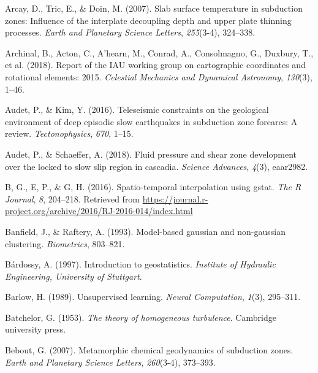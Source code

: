 \begin{CSLReferences}{1}{1}
\leavevmode{}%
Arcay, D., Tric, E., \& Doin, M. (2007). Slab surface temperature in subduction zones: Influence of the interplate decoupling depth and upper plate thinning processes. \emph{Earth and Planetary Science Letters}, \emph{255}(3-4), 324--338.

\leavevmode{}%
Archinal, B., Acton, C., A'hearn, M., Conrad, A., Consolmagno, G., Duxbury, T., et al. (2018). Report of the IAU working group on cartographic coordinates and rotational elements: 2015. \emph{Celestial Mechanics and Dynamical Astronomy}, \emph{130}(3), 1--46.

\leavevmode{}%
Audet, P., \& Kim, Y. (2016). Teleseismic constraints on the geological environment of deep episodic slow earthquakes in subduction zone forearcs: A review. \emph{Tectonophysics}, \emph{670}, 1--15.

\leavevmode{}%
Audet, P., \& Schaeffer, A. (2018). Fluid pressure and shear zone development over the locked to slow slip region in cascadia. \emph{Science Advances}, \emph{4}(3), eaar2982.

\leavevmode{}%
B, G., E, P., \& G, H. (2016). Spatio-temporal interpolation using gstat. \emph{The R Journal}, \emph{8}, 204--218. Retrieved from \url{https://journal.r-project.org/archive/2016/RJ-2016-014/index.html}

\leavevmode{}%
Banfield, J., \& Raftery, A. (1993). Model-based gaussian and non-gaussian clustering. \emph{Biometrics}, 803--821.

\leavevmode{}%
Bárdossy, A. (1997). Introduction to geostatistics. \emph{Institute of Hydraulic Engineering, University of Stuttgart}.

\leavevmode{}%
Barlow, H. (1989). Unsupervised learning. \emph{Neural Computation}, \emph{1}(3), 295--311.

\leavevmode{}%
Batchelor, G. (1953). \emph{The theory of homogeneous turbulence}. Cambridge university press.

\leavevmode{}%
Bebout, G. (2007). Metamorphic chemical geodynamics of subduction zones. \emph{Earth and Planetary Science Letters}, \emph{260}(3-4), 373--393.


\end{CSLReferences}
